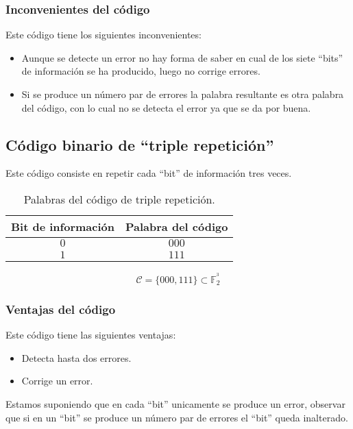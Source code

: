 \subsubsection{Inconvenientes del c\'odigo}

Este c\'odigo tiene los siguientes inconvenientes:
\begin{itemize}
\item Aunque se detecte un error no hay forma de saber en cual de los
siete ``bits'' de informaci\'on se ha producido, luego no corrige errores.
\item Si se produce un n\'umero par de errores la palabra resultante es
otra palabra del c\'odigo, con lo cual no se detecta el error ya que se da
por buena. 
\end{itemize}

\subsection{C\'odigo binario de ``triple repetici\'on''}

Este c\'odigo consiste en repetir cada ``bit'' de informaci\'on tres veces.
\begin{table}[!h]
\begin{center}
\begin{tabular}{|c|c|}
\hline
Bit de informaci\'on & Palabra del c\'odigo \\
\hline
$0$ & $000$ \\
\hline
$1$ & $111$ \\
\hline
\end{tabular}
\end{center}
\caption{Palabras del c\'odigo de triple repetici\'on.}
\end{table}
\begin{displaymath}
\mathcal{C} = \{000,111\} \subset \mathbb{F}^{^3}_2
\end{displaymath}

\subsubsection{Ventajas del c\'odigo}

Este c\'odigo tiene las siguientes ventajas:
\begin{itemize}
\item Detecta hasta dos errores.
\item Corrige un error.
\end{itemize}
Estamos suponiendo que en cada ``bit'' unicamente se produce un error,
observar que si en un ``bit'' se produce un n\'umero par de errores el
``bit'' queda inalterado.\\

